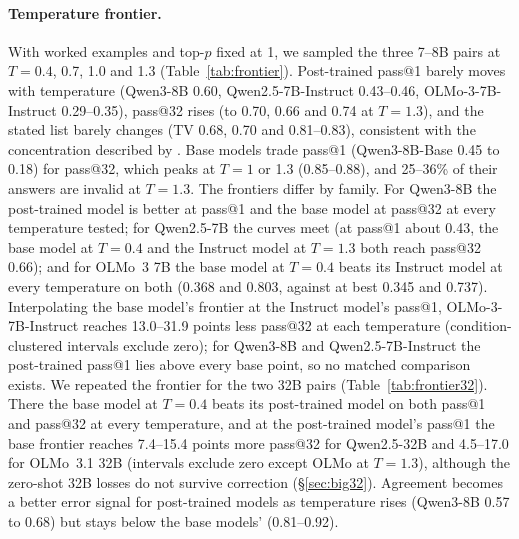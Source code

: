 \documentclass[wcp]{jmlr}
\begin{document}
\paragraph{Temperature frontier.} With worked examples and top-$p$ fixed at 1, we sampled the three 7--8B pairs at $T = 0.4$, 0.7, 1.0 and 1.3 (Table~\ref{tab:frontier}). Post-trained pass@1 barely moves with temperature (Qwen3-8B 0.60, Qwen2.5-7B-Instruct 0.43--0.46, OLMo-3-7B-Instruct 0.29--0.35), pass@32 rises (to 0.70, 0.66 and 0.74 at $T{=}1.3$), and the stated list barely changes (TV 0.68, 0.70 and 0.81--0.83), consistent with the concentration described by \citet{yang2026concentration}. Base models trade pass@1 (Qwen3-8B-Base 0.45 to 0.18) for pass@32, which peaks at $T{=}1$ or 1.3 (0.85--0.88), and 25--36\% of their answers are invalid at $T{=}1.3$. The frontiers differ by family. For Qwen3-8B the post-trained model is better at pass@1 and the base model at pass@32 at every temperature tested; for Qwen2.5-7B the curves meet (at pass@1 about 0.43, the base model at $T{=}0.4$ and the Instruct model at $T{=}1.3$ both reach pass@32 0.66); and for OLMo~3 7B the base model at $T{=}0.4$ beats its Instruct model at every temperature on both (0.368 and 0.803, against at best 0.345 and 0.737). Interpolating the base model's frontier at the Instruct model's pass@1, OLMo-3-7B-Instruct reaches 13.0--31.9 points less pass@32 at each temperature (condition-clustered intervals exclude zero); for Qwen3-8B and Qwen2.5-7B-Instruct the post-trained pass@1 lies above every base point, so no matched comparison exists. We repeated the frontier for the two 32B pairs (Table~\ref{tab:frontier32}). There the base model at $T{=}0.4$ beats its post-trained model on both pass@1 and pass@32 at every temperature, and at the post-trained model's pass@1 the base frontier reaches 7.4--15.4 points more pass@32 for Qwen2.5-32B and 4.5--17.0 for OLMo~3.1 32B (intervals exclude zero except OLMo at $T{=}1.3$), although the zero-shot 32B losses do not survive correction (\S\ref{sec:big32}). Agreement becomes a better error signal for post-trained models as temperature rises (Qwen3-8B 0.57 to 0.68) but stays below the base models' (0.81--0.92).
\end{document}
